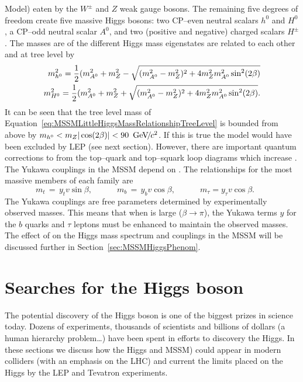 Model) eaten by the $W^\pm$ and $Z$ weak gauge bosons.  The remaining five
degrees of freedom create five massive Higgs bosons: two CP--even neutral
scalars $h^0$ and $H^0$, a CP--odd neutral scalar $A^0$, and two (positive and
negative) charged scalars $H^\pm$.  The masses are of the different Higgs mass
eigenstates are related to each other and \tanb at tree level by
\begin{eqnarray}
  m_{h^0}^2 = \frac{1}{2}(m_{A^0}^2 + m_Z^2 - \sqrt{
  (m_{A^0}^2 - m_Z^2)^2 + 4m_Z^2m_{A^0}^2\sin^2(2\beta)} 
  \label{eq:MSSMLittleHiggsMassRelationshipTreeLevel} \\
  m_{H^0}^2 = \frac{1}{2}(m_{A^0}^2 + m_Z^2 + \sqrt{
  (m_{A^0}^2 - m_Z^2)^2 + 4m_Z^2m_{A^0}^2\sin^2(2\beta)}. 
  \label{eq:MSSMHiggs0MassRelationshipTreeLevel}
\end{eqnarray}
It can be seen that the tree level mass \mhZero of
Equation~\ref{eq:MSSMLittleHiggsMassRelationshipTreeLevel} is bounded from above
by $m_{h^0} < m_Z|\cos(2\beta)| < 90~{\,\text{Ge\hspace{-.08em}V\hspace{-0.16em}/\hspace{-0.08em}}c^\text{2}}$.  If this is true the
model would have been excluded by LEP (see next section).  However, there are
important quantum corrections to \mhZero from the top--quark and top--squark
loop diagrams which increase \mhZero.  The Yukawa couplings in the MSSM depend
on \tanb.  The relationships for the most massive members of each family are
\begin{equation}
  m_t \,=\, y_t v \sin\beta
  ,
  \qquad\quad
  m_b \,=\, y_b v \cos\beta
  ,
  \qquad\quad
  m_\tau = y_\tau v \cos\beta.\phantom{xxx}
  \label{eq:YukawaTanBeta}
\end{equation}
The Yukawa couplings are free parameters determined by experimentally observed
masses.  This means that when \tanb is large ($\beta \to \pi$), the Yukawa terms
$y$ for the $b$ quarks and $\tau$ leptons must be enhanced to maintain the
observed masses.  The effect of \tanb on the Higgs mass spectrum and couplings
in the MSSM will be discussed further in Section~\ref{sec:MSSMHiggsPhenom}.
%
\section{Searches for the Higgs boson}
The potential discovery of the Higgs boson is one of the biggest prizes in
science today.  Dozens of experiments, thousands of scientists and billions of
dollars (a human hierarchy problem\ldots) have been spent in efforts to
discovery the Higgs.  In these sections we discuss how the Higgs and MSSM) could
appear in modern colliders (with an emphasis on the LHC) and current the limits
placed on the Higgs by the LEP and Tevatron experiments.  
%
